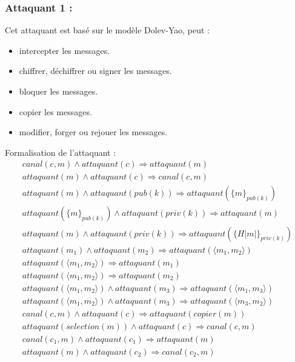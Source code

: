 \documentclass[10pt,a4paper]{article}
\begin{document}
\subsubsection{Attaquant 1 :}
Cet attaquant est basé sur le modèle Dolev-Yao, peut :
\begin{itemize}
\item intercepter les messages.
\item chiffrer, déchiffrer ou signer les messages.
\item bloquer les messages.
\item copier les messages.
\item modifier, forger ou rejouer les messages.\\
\end{itemize}
Formalisation de l'attaquant :   
\[
\begin{array}{l}
canal(c,m)\wedge attaquant(c)\Longrightarrow attaquant(m)\\
attaquant(m)\wedge attaquant(c)\Longrightarrow canal(c,m)\\
attaquant(m)\wedge attaquant(pub(k))\Longrightarrow attaquant({\lbrace m\rbrace}_{pub(k)})
\\
attaquant({\lbrace m\rbrace}_{pub(k)}) \wedge attaquant(priv(k))\Longrightarrow attaquant(m) 
\\ 
attaquant(m)\wedge attaquant(priv(k))\Longrightarrow attaquant({\lbrace H|m|\rbrace}_{priv(k)})
\\
attaquant(m_{1})\wedge attaquant(m_{2})\Longrightarrow attaquant(\langle m_{1},m_{2}\rangle)\\ 
attaquant(\langle m_{1},m_{2}\rangle)\Longrightarrow attaquant(m_{1})\\ 
attaquant(\langle m_{1},m_{2}\rangle)\Longrightarrow attaquant(m_{2})\\ 
attaquant(\langle m_{1},m_{2}\rangle)\wedge attaquant(m_{3})\Longrightarrow attaquant(\langle m_{1},m_{3}\rangle)\\ 
attaquant(\langle m_{1},m_{2}\rangle)\wedge attaquant(m_{3})\Longrightarrow attaquant(\langle m_{3},m_{2}\rangle)\\ 
canal(c,m)\wedge attaquant(c)\Longrightarrow attaquant(copier(m))\\
attaquant(selection(m))\wedge attaquant(c)\Longrightarrow canal(c,m)\\ 
canal(c_{1},m)\wedge attaquant(c_{1})\Longrightarrow attaquant(m)\\
attaquant(m)\wedge attaquant(c_{2})\Longrightarrow canal(c_{2},m)\\ 
\end{array}
\]
\end{document}
